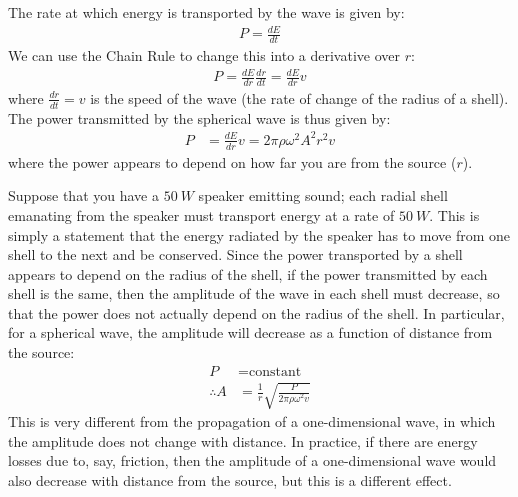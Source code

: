 The rate at which energy is transported by the wave is given by:
\begin{align*}
P = \frac{dE}{dt}
\end{align*}
We can use the Chain Rule to change this into a derivative over $r$:
\begin{align*}
P = \frac{dE}{dr}\frac{dr}{dt}=\frac{dE}{dr}v
\end{align*}
where $\frac{dr}{dt}=v$ is the speed of the wave (the rate of change of the radius of a shell). The power transmitted by the spherical wave is thus given by:
\begin{align*}
P &=\frac{dE}{dr}v =2\pi\rho  \omega^2 A^2  r^2 v
\end{align*}
where the power appears to depend on how far you are from the source ($r$). 

Suppose that you have a $\SI{50}{W}$ speaker emitting sound; each radial shell emanating from the speaker must transport energy at a rate of $\SI{50}{W}$. This is simply a statement that the energy radiated by the speaker has to move from one shell to the next and be conserved. Since the power transported by a shell appears to depend on the radius of the shell, if the power transmitted by each shell is the same, then the amplitude of the wave in each shell must decrease, so that the power does not actually depend on the radius of the shell. In particular, for a spherical wave, the amplitude will decrease as a function of distance from the source:
\begin{align*}
P& = \text{constant}\\
\therefore A&=\frac{1}{r}\sqrt{\frac{P}{2\pi\rho \omega^2 v}}
\end{align*}
This is very different from the propagation of a one-dimensional wave, in which the amplitude does not change with distance. In practice, if there are energy losses due to, say, friction, then the amplitude of a one-dimensional wave would also decrease with distance from the source, but this is a different effect.

